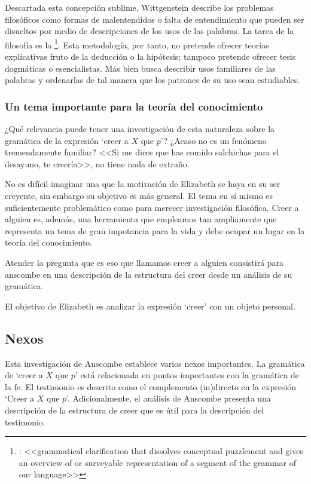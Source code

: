 Descartada esta concepción sublime, Wittgenstein describe los problemas
filosóficos como formas de malentendidos o falta de entendimiento que pueden ser
disueltos por medio de descripciones de los usos de las palabras. La tarea de la
filosofía es la \footnote{\cite[12]{bakerhacker2009understanding}: <<grammatical
  clarification that dissolves conceptual puzzlement and gives an overview of or
  surveyable representation of a segment of the grammar of our language>>}. Esta
metodología, por tanto, no pretende ofrecer teorías explicativas fruto de la
deducción o la hipótesis; tampoco pretende ofrecer tesis dogmáticas o
esencialistas. Más bien busca describir usos familiares de las palabras y
ordenarlas de tal manera que los patrones de su uso sean
estudiables\autocite[Cf.~][12]{bakerhacker2009understanding}.

\subsubsection{Un tema importante para la teoría del conocimiento}
¿Qué relevancia puede tener una investigación de esta naturaleza sobre la
gramática de la expresión `creer a $X$ que $p$'? ¿Acaso no es un fenómeno
tremendamente familiar? <<Si me dices que has comido salchichas para el
desayuno, te creería>>\autocite[1]{anscombe2008faith:tobelieve}, no tiene nada
de extraño.

No es difícil imaginar una que la motivación de Elizabeth se haya en su ser
creyente, sin embargo su objetivo es más general. El tema en sí mismo es
suficientemente problemático como para merecer investigación filosófica. Creer a
alguien es, además, una herramienta que empleamos tan ampliamente que representa
un tema de gran impotancia para la vida y debe ocupar un lugar en la teoría del
conocimiento.

Atender la pregunta que es eso que llamamos creer a alguien consistirá para
anscombe en una descripción de la estructura del creer desde un análisis de su
gramática.

El objetivo de Elizabeth es analizar la expresión `creer' con un objeto
personal.

\subsection{Nexos}
Esta investigación de Anscombe establece varios nexos importantes. La gramática
de `creer a $X$ que $p$' está relacionada en puntos importantes con la gramática
de la fe. El testimonio es descrito como el complemento (in)directo en la
expresión `Creer a $X$ que $p$'. Adicionalmente, el análisis de Anscombe
presenta una descripción de la estructura de creer que es útil para la
descripción del testimonio.

